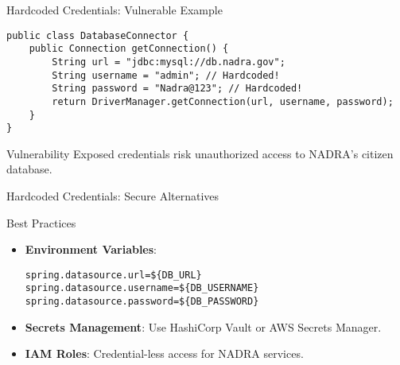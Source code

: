 \documentclass[12pt]{beamer}
\begin{document}
\begin{frame}[fragile]{Hardcoded Credentials: Vulnerable Example}
  \begin{lstlisting}[style=javastyle]
public class DatabaseConnector {
    public Connection getConnection() {
        String url = "jdbc:mysql://db.nadra.gov";
        String username = "admin"; // Hardcoded!
        String password = "Nadra@123"; // Hardcoded!
        return DriverManager.getConnection(url, username, password);
    }
}
  \end{lstlisting}
  \begin{alertblock}{Vulnerability}
    Exposed credentials risk unauthorized access to NADRA’s citizen database.
  \end{alertblock}
\end{frame}

\begin{frame}[fragile]{Hardcoded Credentials: Secure Alternatives}
  \begin{block}{Best Practices}
    \begin{itemize}
      \item \textbf{Environment Variables}:
        \begin{lstlisting}[style=javastyle]
spring.datasource.url=${DB_URL}
spring.datasource.username=${DB_USERNAME}
spring.datasource.password=${DB_PASSWORD}
        \end{lstlisting}
      \item \textbf{Secrets Management}: Use HashiCorp Vault or AWS Secrets Manager.
      \item \textbf{IAM Roles}: Credential-less access for NADRA services.
    \end{itemize}
  \end{block}
\end{frame}
\end{document}
